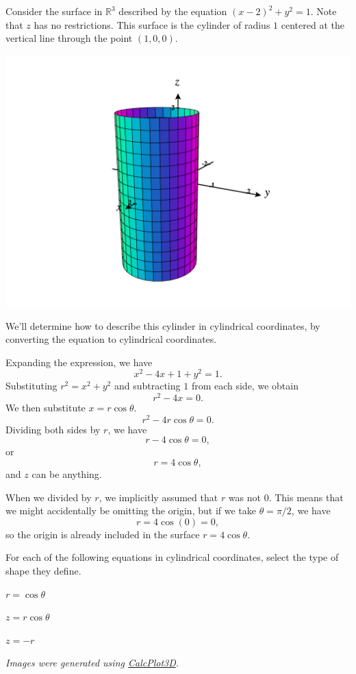 \documentclass{ximera}
\begin{document}
\begin{example}
Consider the surface in $\mathbb{R}^3$ described by the equation $(x-2)^2 + y^2 = 1$. Note that $z$ has no restrictions. This surface is the cylinder of radius $1$ centered at the vertical line through the point $(1,0,0)$.

\begin{image}
\includegraphics[width=\textwidth]{CalcPlot3D-cylinder_100}
\end{image}

We'll determine how to describe this cylinder in cylindrical coordinates, by converting the equation to cylindrical coordinates.

Expanding the expression, we have
\[
x^2-4x+1+y^2 =1.
\]
Substituting $r^2 = x^2+y^2$ and subtracting $1$ from each side, we obtain
\[
r^2-4x=0.
\]
We then substitute $x = r\cos\theta$.
\[
r^2-4r\cos\theta = 0.
\]
Dividing both sides by $r$, we have
\[
r-4\cos\theta = 0,
\]
or
\[
r = 4\cos\theta,
\]
and $z$ can be anything.

When we divided by $r$, we implicitly assumed that $r$ was not $0$. This means that we might accidentally be omitting the origin, but if we take $\theta = \pi/2$, we have
\[
r = 4\cos(0) = 0,
\]
so the origin is already included in the surface $r = 4\cos\theta$.

\end{example}

\begin{problem}
For each of the following equations in cylindrical coordinates, select the type of shape they define.

$r = \cos\theta$
\begin{multipleChoice}
\end{multipleChoice}

$z = r\cos\theta$
\begin{multipleChoice}
\end{multipleChoice}

$z = -r$
\begin{multipleChoice}
\end{multipleChoice}
\end{problem}


\textit{Images were generated using \href{https://www.monroecc.edu/faculty/paulseeburger/calcnsf/CalcPlot3D/}{CalcPlot3D}.}
\end{document}
